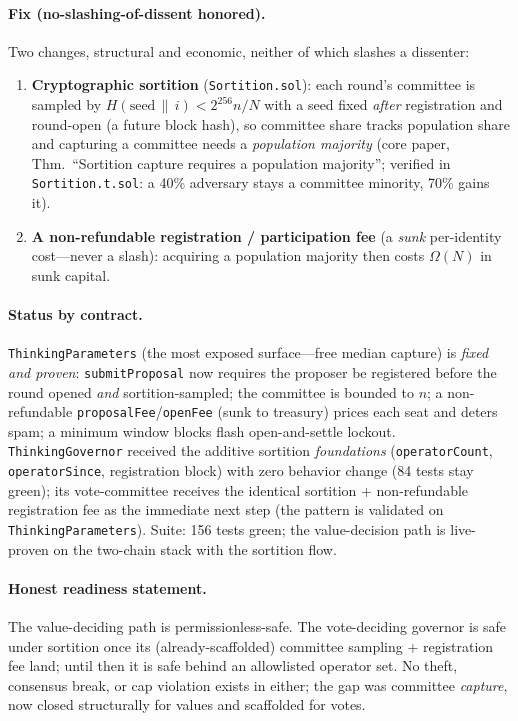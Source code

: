 \documentclass[11pt]{article}
\begin{document}
\paragraph{Fix (no-slashing-of-dissent honored).} Two changes, structural and
economic, neither of which slashes a dissenter:
\begin{enumerate}[leftmargin=1.4em]
\item \textbf{Cryptographic sortition} (\texttt{Sortition.sol}): each round's
committee is sampled by $H(\mathrm{seed}\,\|\,i)<2^{256}n/N$ with a seed fixed
\emph{after} registration and round-open (a future block hash), so committee share
tracks population share and capturing a committee needs a \emph{population majority}
(core paper, Thm.~``Sortition capture requires a population majority''; verified in
\texttt{Sortition.t.sol}: a 40\% adversary stays a committee minority, 70\% gains it).
\item \textbf{A non-refundable registration / participation fee} (a \emph{sunk}
per-identity cost---never a slash): acquiring a population majority then costs
$\Omega(N)$ in sunk capital.
\end{enumerate}

\paragraph{Status by contract.} \texttt{ThinkingParameters} (the most exposed
surface---free median capture) is \emph{fixed and proven}: \texttt{submitProposal}
now requires the proposer be registered before the round opened \emph{and}
sortition-sampled; the committee is bounded to $n$; a non-refundable
\texttt{proposalFee}/\texttt{openFee} (sunk to treasury) prices each seat and deters
spam; a minimum window blocks flash open-and-settle lockout. \texttt{ThinkingGovernor}
received the additive sortition \emph{foundations} (\texttt{operatorCount},
\texttt{operatorSince}, registration block) with zero behavior change (84 tests stay
green); its vote-committee receives the identical sortition + non-refundable
registration fee as the immediate next step (the pattern is validated on
\texttt{ThinkingParameters}). Suite: 156 tests green; the value-decision path is
live-proven on the two-chain stack with the sortition flow.

\paragraph{Honest readiness statement.} The value-deciding path is permissionless-safe.
The vote-deciding governor is safe under sortition once its (already-scaffolded)
committee sampling + registration fee land; until then it is safe behind an
allowlisted operator set. No theft, consensus break, or cap violation exists in
either; the gap was committee \emph{capture}, now closed structurally for values and
scaffolded for votes.
\end{document}
